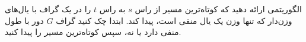 الگوریتمی ارائه دهید که کوتاه‌ترین مسیر از راس $s$ به راس $t$ را در یک گراف با یال‌های وزن‌دار که تنها وزن یک یال منفی است، پیدا کند. ابتدا چک کنید گراف $G$ دور با طول منفی دارد یا نه، سپس کوتاه‌ترین مسیر را پیدا کنید. 